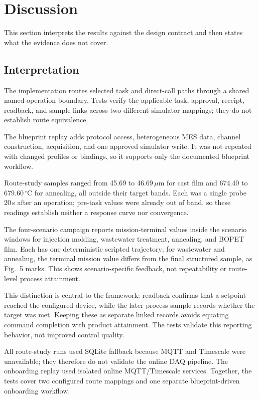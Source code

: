 \section{Discussion}
\label{sec:limits}
This section interprets the results against the design contract and then states
what the evidence does not cover.

\subsection{Interpretation}
The implementation routes selected task and direct-call paths through a
shared named-operation boundary. Tests verify the applicable task, approval,
receipt, readback, and sample links across two different simulator mappings;
they do not establish route equivalence.

The blueprint replay adds protocol access, heterogeneous MES data, channel
construction, acquisition, and one approved simulator write. It was not
repeated with changed profiles or bindings, so it supports only the documented
blueprint workflow.

Route-study samples ranged from 45.69 to 46.69\,$\mu$m for cast film and
674.40 to 679.60\,$^{\circ}$C for annealing, all outside their target bands.
Each was a single probe 20\,s after an operation; pre-task values were already
out of band, so these readings establish neither a response curve nor
convergence.

The four-scenario campaign reports mission-terminal values inside the
scenario windows for injection molding, wastewater treatment, annealing, and
BOPET film. Each has one deterministic scripted trajectory; for wastewater
and annealing, the terminal mission value differs from the final structured
sample, as Fig.~5 marks. This shows scenario-specific feedback, not
repeatability or route-level process attainment.

This distinction is central to the framework: readback confirms that a
setpoint reached the configured device, while the later process sample records
whether the target was met. Keeping these as separate linked records avoids
equating command completion with product attainment. The tests validate this
reporting behavior, not improved control quality.

All route-study runs used SQLite fallback because MQTT and Timescale were
unavailable; they therefore do not validate the online DAQ pipeline. The
onboarding replay used
isolated online MQTT/Timescale services. Together, the tests cover two
configured route mappings and one separate blueprint-driven onboarding
workflow.

